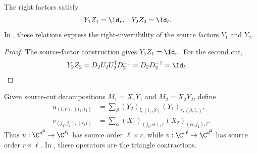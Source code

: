 \begin{lemma}
    \label{thm:mpu_source_factor_right_inverses}
    \leanok
    The right factors satisfy
    \begin{align}
        Y_1Z_1 & =\Id_r, & Y_2Z_2 & =\Id_\ell.
    \end{align}
    In \cite[Section~III]{Cirac2017MPU}, these relations express the right-invertibility of the source factors $Y_1$ and $Y_2$.
\end{lemma}

\begin{proof}
    \leanok
    The source-factor construction gives $Y_1Z_1=\Id_r$. For the
    second cut,
    \begin{align}
        Y_2Z_2
         & =D_2U_2U_2^\dagger D_2^{-1}
        =D_2D_2^{-1}=\Id_\ell.
    \end{align}
\end{proof}

\begin{definition}
    \label{def:mpu_source_uv}
    \leanok
    Given source-cut decompositions $M_1=X_1Y_1$ and $M_2=X_2Y_2$, define
    \begin{align}
        u_{(l,r),(i_1,i_2)}
         & =\sum_\beta (Y_2)_{l,(i_1,\beta)}(Y_1)_{r,(\beta,i_2)},    \\
        v_{(j_1,j_2),(r,l)}
         & =\sum_\alpha (X_1)_{(j_1,\alpha),r}(X_2)_{(\alpha,j_2),l}.
    \end{align}
    Thus $u:\C^{d^2}\to\C^{\ell r}$ has source order $\ell\times r$,
    while $v:\C^{r\ell}\to\C^{d^2}$ has source order $r\times\ell$.
    In \cite[Section~III, equations~\texttt{uuvv}--\texttt{vdagger}]{Cirac2017MPU}, these operators are the triangle
    contractions.
\end{definition}

